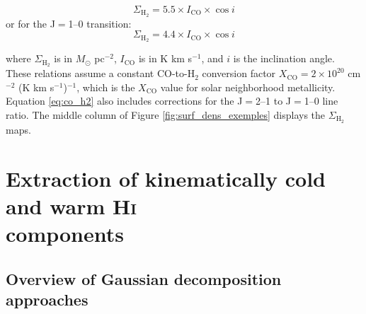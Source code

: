\begin{equation}
	\Sigma_{\mathrm{H}_2} = 5.5 \times I_{\mathrm{CO}} \times \cos i 
	\label{eq:co_h2}
\end{equation}
or for the J$=$1--0 transition:
\begin{equation}
	\Sigma_{\mathrm{H}_2} = 4.4 \times I_{\mathrm{CO}} \times \cos i 
	\label{eq:co10_h2}
\end{equation}

\noindent where $\Sigma_{\mathrm{H}_2}$ is in $M_\odot$ pc$^{-2}$, $I_{\mathrm{CO}}$ is in K km s$^{-1}$, and $i$ is the inclination angle. These relations assume a constant CO-to-H$_2$ conversion factor $X_{\mathrm{CO}} = 2 \times 10^{20}$ cm$^{-2}$ (K km s$^{-1}$)$^{-1}$, which is the $X_{\mathrm{CO}}$ value for solar neighborhood metallicity. Equation \ref{eq:co_h2} also includes corrections for the J$=$2--1 to J$=$1--0 line ratio. The middle column of Figure \ref{fig:surf_dens_exemples} displays the $\Sigma_{\mathrm{H}_2}$ maps.



\section[Extraction of kinematically cold and warm \textrm{H\textsc{i}} components]{Extraction of kinematically cold and warm \textrm{H\textsc{i}}\\components}
\label{sec:ROHSA}

\subsection{Overview of Gaussian decomposition approaches}

